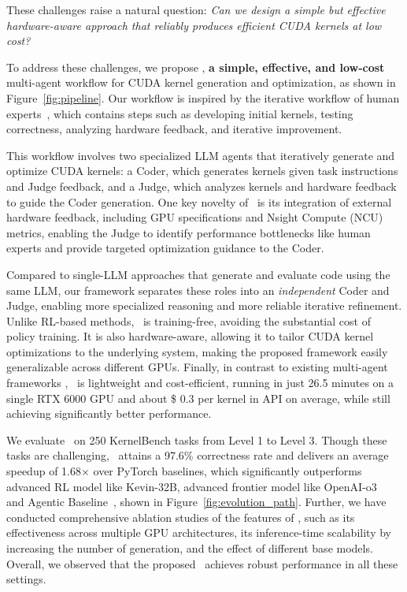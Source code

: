 These challenges raise a natural question: \textit{Can we design a simple but effective hardware-aware approach that reliably produces efficient CUDA kernels at low cost?} 



To address these challenges, we propose \agentname, {\bf a simple,  effective, and low-cost} multi-agent workflow for CUDA kernel generation and optimization, as shown in Figure~\ref{fig:pipeline}. Our workflow is inspired by the iterative workflow of human experts~\citep{10946796,cudaguide,w4a8gemm}, which contains steps such as developing initial kernels, testing correctness, analyzing hardware feedback, and iterative improvement.


This workflow involves two specialized LLM agents that iteratively generate and optimize CUDA kernels: a Coder, which generates kernels given task instructions and Judge feedback, and a Judge, which analyzes kernels and hardware feedback to guide the Coder generation. One key novelty of \agentname~is its integration of external hardware feedback, including GPU specifications and Nsight Compute (NCU) metrics, enabling the Judge to identify performance bottlenecks like human experts and provide targeted optimization guidance to the Coder.



Compared to single-LLM approaches that  generate and evaluate code using the same LLM, our framework separates these roles into an {\it independent} Coder and Judge, enabling more specialized reasoning and more reliable iterative refinement.
Unlike RL-based methods, \agentname~is  training-free, avoiding the substantial cost of policy training. It is also  hardware-aware, allowing it to tailor CUDA kernel optimizations to the underlying system, making the proposed framework easily generalizable across different GPUs.
Finally, in contrast to existing multi-agent frameworks \citep{lange2025robustagenticcudakernel}, \agentname~is lightweight and cost-efficient, running in just 26.5 minutes on a single RTX 6000 GPU and about \$ 0.3 per kernel in API on average, while still achieving significantly better performance.


We evaluate \agentname~on 250 KernelBench tasks from Level 1 to Level 3. Though these tasks are challenging, \agentname~attains a 97.6\% correctness rate and delivers an average speedup of 1.68× over PyTorch baselines, which significantly outperforms advanced RL model like Kevin-32B, advanced frontier model like OpenAI-o3~\citep{openai2025o3systemcard} and Agentic Baseline~\citep{lange2025robustagenticcudakernel}, shown in Figure~\ref{fig:evolution_path}. Further, we have conducted comprehensive ablation studies of the features of \agentname, such as its effectiveness across multiple GPU architectures, its inference-time scalability by increasing the number of generation, and the effect of different base models. Overall, we observed that the proposed  \agentname~achieves robust performance in all these settings. 


